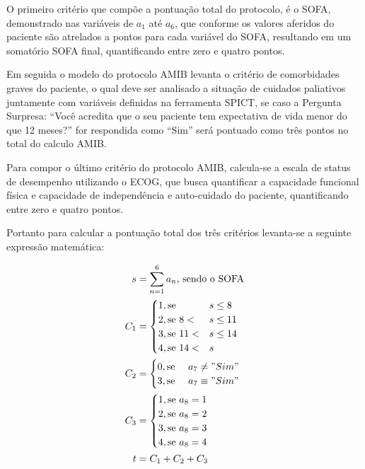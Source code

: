 \documentclass[12pt]{article}
\begin{document}
O primeiro critério que compõe a pontuação total do protocolo, é o SOFA, demonstrado nas variáveis de $a_1$ até $a_6$, que conforme os valores aferidos do paciente são atrelados a pontos para cada variável do SOFA, resultando em um somatório SOFA final, quantificando entre zero e quatro pontos.

Em seguida o modelo do protocolo AMIB levanta o critério de comorbidades graves do paciente, o qual deve ser analisado a situação de cuidados paliativos juntamente com variáveis definidas na ferramenta SPICT, se caso a Pergunta Surpresa: “Você acredita que o seu paciente tem expectativa de vida menor do que 12 meses?” for respondida como “Sim” será pontuado como três pontos no total do calculo AMIB.

Para compor o último critério do protocolo AMIB, calcula-se a escala de status de desempenho utilizando o ECOG, que busca quantificar a capacidade funcional física e capacidade de independência e auto-cuidado do paciente, quantificando entre zero e quatro pontos.

Portanto para calcular a pontuação total dos três critérios levanta-se a seguinte expressão matemática:

\[
\begin{split}
    s &= \sum_{n=1}^{6} a_n\text{, sendo o SOFA} \\
    C_1 &= \begin{cases}
        1, \text{se } & s \le 8 \\
        2, \text{se } 8 < & s \le 11 \\
        3, \text{se } 11 < & s \le  14 \\
        4, \text{se } 14 < & s \\
    \end{cases} \\
    C_2 &= \begin{cases}
        0, \text{se } & a_7 \neq "Sim" \\
        3, \text{se } & a_7 \equiv "Sim" \\
    \end{cases} \\
    C_3 &= \begin{cases}
        1, \text{se } a_8 = 1 \\
        2, \text{se } a_8 = 2 \\
        3, \text{se } a_8 = 3 \\
        4, \text{se } a_8 = 4 \\
    \end{cases} \\
    t &= C_1 + C_2 + C_3 \\
\end{split}
\] 
\end{document}
